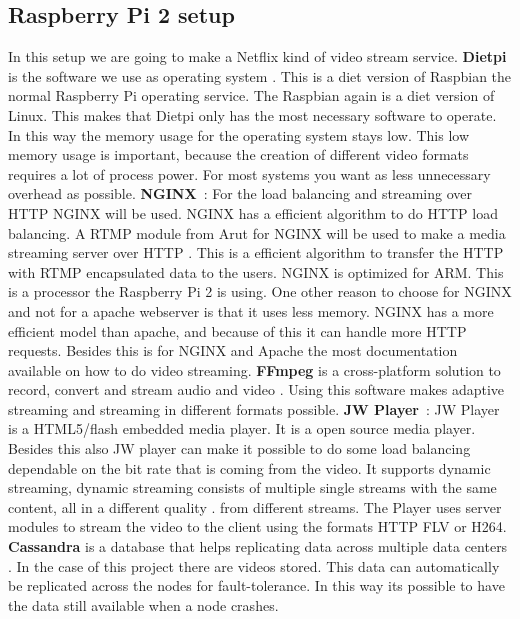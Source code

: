 \documentclass{sig-alternate-br}
\begin{document}
\subsection{Raspberry Pi 2 setup}\label{sec:setup}
In this setup we are going to make a Netflix kind of video stream service. \newline
\textbf{Dietpi} is the software we use as operating system \cite{dietpi}. This is a diet version of Raspbian the normal Raspberry Pi operating service. The Raspbian again is a diet version of Linux. This makes that Dietpi only has the most necessary software to operate. In this way the memory usage for the operating system stays low. This low memory usage is important, because the creation of different video formats requires a lot of process power. For most systems you want as less unnecessary overhead as possible. \newline
\textbf{NGINX}~\cite{nginx}: For the load balancing and streaming over HTTP NGINX will be used. NGINX has a efficient algorithm to do HTTP load balancing. A RTMP module from Arut for NGINX will be used to make a media streaming server over HTTP \cite{arut}. This is a efficient algorithm to transfer the HTTP with RTMP encapsulated data to the users. NGINX is optimized for ARM. This is a processor the Raspberry Pi 2 is using. One other reason to choose for NGINX and not for a apache webserver is that it uses less memory. NGINX has a more efficient model than apache, and because of this it can handle more HTTP requests. Besides this is for NGINX and Apache the most documentation available on how to do video streaming. \newline
\textbf{FFmpeg} is a cross-platform solution to record, convert and stream audio and video \cite{ffmpeg}. Using this software makes adaptive streaming and streaming in different formats possible. \newline
\textbf{JW Player}~\cite{jwplayer}: JW Player is a HTML5/flash embedded media player. It is a open source media player. Besides this also JW player can make it possible to do some load balancing dependable on the bit rate that is coming from the video. It supports dynamic streaming, dynamic streaming consists of multiple single streams with the same content, all in a different quality \cite{jwplayer}. from different streams. The Player uses server modules to stream the video to the client using the formats HTTP FLV or H264.\newline
\textbf{Cassandra} is a database that helps replicating data across multiple data centers \cite{cassandra}. In the case of this project there are videos stored. This data can automatically be replicated across the nodes for fault-tolerance. In this way its possible to have the data still available when a node crashes.
\end{document}
